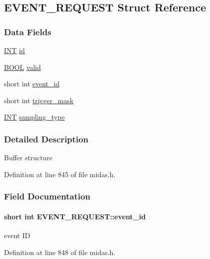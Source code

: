 \subsection{EVENT\_\-REQUEST Struct Reference}
\label{structEVENT__REQUEST}
\subsubsection*{Data Fields}
\begin{DoxyCompactItemize}
\item 
\hyperlink{vppg_8h_a392e62da233ed3e2f7c3fd4f487a3896}{INT} \hyperlink{structEVENT__REQUEST_ab5275898e99714ff529f7fe125a91d0e}{id}
\item 
\hyperlink{vt2_8h_a239c7f0d40651c3e419c5b9651507d14}{BOOL} \hyperlink{structEVENT__REQUEST_aeac92027d8c58b1af391b5d76655f9bf}{valid}
\item 
short int \hyperlink{structEVENT__REQUEST_a861d57422d21affdcfe60a67a3f8cb7f}{event\_\-id}
\item 
short int \hyperlink{structEVENT__REQUEST_a8947eb12d18f6202ecc9d603f3bde410}{trigger\_\-mask}
\item 
\hyperlink{vppg_8h_a392e62da233ed3e2f7c3fd4f487a3896}{INT} \hyperlink{structEVENT__REQUEST_a98d63806bfe8b8d66fad6d3d6d9b08e4}{sampling\_\-type}
\end{DoxyCompactItemize}


\subsubsection{Detailed Description}
Buffer structure 

Definition at line 845 of file midas.h.

\subsubsection{Field Documentation}
\paragraph[{event\_\-id}]{\setlength{\rightskip}{0pt plus 5cm}short int {\bf EVENT\_\-REQUEST::event\_\-id}}\hfill\label{structEVENT__REQUEST_a861d57422d21affdcfe60a67a3f8cb7f}
event ID 

Definition at line 848 of file midas.h.

